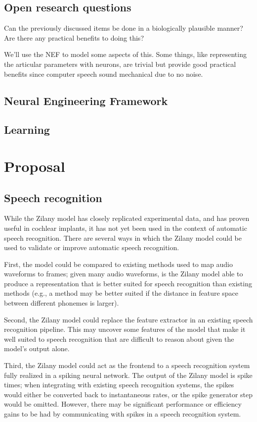 \documentclass{article}
\begin{document}
\subsection{Open research questions}

Can the previously discussed items
be done in a biologically plausible manner?
Are there any practical benefits to doing this?

We'll use the NEF to model some aspects of this.
Some things,
like representing the articular parameters with neurons,
are trivial but provide good practical benefits
since computer speech sound mechanical due to no noise.

\subsection{Neural Engineering Framework}

\subsection{Learning}

\section{Proposal}

\subsection{Speech recognition}

While the Zilany model
has closely replicated experimental data,
and has proven useful in cochlear implants,
it has not yet been used in the context
of automatic speech recognition.
There are several ways in which
the Zilany model could be used
to validate or improve automatic speech recognition.

First, the model could be compared
to existing methods used to map
audio waveforms to frames;
given many audio waveforms,
is the Zilany model able to
produce a representation that
is better suited for speech recognition
than existing methods
(e.g., a method may be better suited
if the distance in feature space
between different phonemes is larger).

Second, the Zilany model could
replace the feature extractor
in an existing speech recognition pipeline.
This may uncover some features
of the model that make it well suited
to speech recognition that
are difficult to reason about
given the model's output alone.

Third, the Zilany model could
act as the frontend to a
speech recognition system
fully realized in a spiking neural network.
The output of the Zilany model
is spike times;
when integrating with existing
speech recognition systems,
the spikes would either be
converted back to instantaneous rates,
or the spike generator step
would be omitted.
However, there may be significant performance
or efficiency gains to be had
by communicating with spikes
in a speech recognition system.
\end{document}
